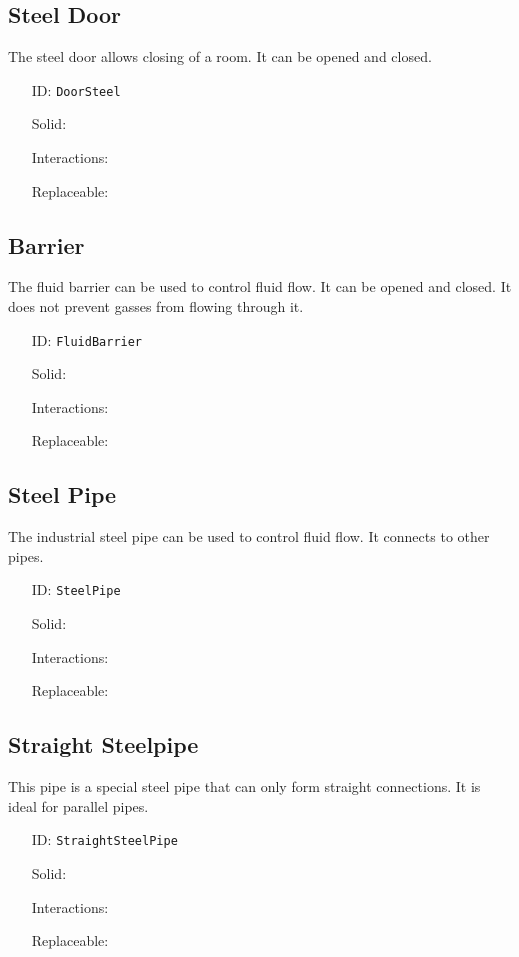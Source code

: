 \subsection{Steel Door}\label{subsec:blocks_steel door}
The steel door allows closing of a room. It can be opened and closed.
\newline
\begin{itemize}[nosep]
\item[ID:] \texttt{DoorSteel}
\item[Solid:]  \Checkmark \item[Interactions:]  \Checkmark \item[Replaceable:]  \XSolidBrush \end{itemize}

\subsection{Barrier}\label{subsec:blocks_barrier}
The fluid barrier can be used to control fluid flow. It can be opened and closed.
                It does not prevent gasses from flowing through it.
\newline
\begin{itemize}[nosep]
\item[ID:] \texttt{FluidBarrier}
\item[Solid:]  \Checkmark \item[Interactions:]  \Checkmark \item[Replaceable:]  \XSolidBrush \end{itemize}

\subsection{Steel Pipe}\label{subsec:blocks_steel pipe}
The industrial steel pipe can be used to control fluid flow.
                It connects to other pipes.
\newline
\begin{itemize}[nosep]
\item[ID:] \texttt{SteelPipe}
\item[Solid:]  \Checkmark \item[Interactions:]  \XSolidBrush \item[Replaceable:]  \XSolidBrush \end{itemize}

\subsection{Straight Steelpipe}\label{subsec:blocks_straight steelpipe}
This pipe is a special steel pipe that can only form straight connections.
                It is ideal for parallel pipes.
\newline
\begin{itemize}[nosep]
\item[ID:] \texttt{StraightSteelPipe}
\item[Solid:]  \Checkmark \item[Interactions:]  \XSolidBrush \item[Replaceable:]  \XSolidBrush \end{itemize}

